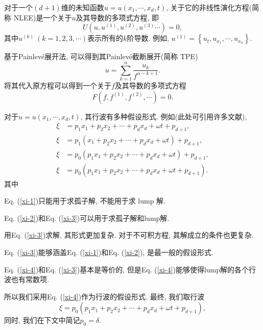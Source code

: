 \documentclass[12pt,a4paper,UTF8]{article}
\newcommand{\sbrace}[1]{\left(#1\right)}
\newcommand{\bbrace}[1]{\left\{#1\right\}}
\newcommand{\up}[1]{^{(#1)}}
\newcommand{\Painleve}{Painlev{\'e}}
\newcommand{\refeqn}[1]{Eq. (\ref{#1})}
\begin{document}
对于一个$(d+1)$维的未知函数$u=u(x_1,\cdots,x_d,t)$, 关于它的非线性演化方程(简称 NLEE)是一个关于$u$及其导数的多项式方程, 即
\begin{equation}
    U(u,u\up{1},u\up{2},u\up{3}\cdots)=0, \label{oeq}
\end{equation}
其中$u\up{k}~(k=1,2,3,\cdots)$表示所有的$k$阶导数. 例如, $u\up{1}=\bbrace{u_t,u_{x_1},\cdots,u_{x_n}}$.

基于\Painleve{}展开法, 可以得到其\Painleve{}截断展开(简称 TPE)
\begin{equation}
u=\sum_{k=1}^{\alpha}{\frac{u_k}{f^{\alpha-k+1}}}. 
\end{equation}
将其代入原方程可以得到一个关于$f$及其导数的多项式方程 
\begin{equation}
F\sbrace{f,f\up{1},f\up{2},\cdots}=0.
\end{equation}

对于$u=u\sbrace{x_1,\cdots,x_d,t}$, 其行波有多种假设形式. 例如(此处可引用许多文献), 
\begin{subequations}
\begin{align}
\xi&=p_1 x_1 + p_2 x_2 + \cdots + p_d x_d + \omega t+p_{d+1},  \label{xi-1}\\ 
\xi&=p_1 (x_1 + p_2 x_2 + \cdots + p_d x_d + \omega t)+p_{d+1}, \label{xi-2}\\ 
\xi&=p_0 \sbrace{p_1 x_1 + p_2 x_2 + \cdots + p_d x_d + \omega t}+p_{d+1}, \label{xi-3}\\
\xi&=p_0 \sbrace{p_1 x_1 + p_2 x_2 + \cdots + p_d x_d + \omega t+p_{d+1}}. \label{xi-4} 
\end{align}
\end{subequations}
其中
\begin{compactitem}[\textbullet]
\item \refeqn{xi-1}只能用于求孤子解, 不能用于求 lump 解.
\item \refeqn{xi-2}和\refeqn{xi-3}可以用于求孤子解和lump解. 
\item 用\refeqn{xi-3}求解, 其形式更加复杂. 对于不可积方程, 其解成立的条件也更复杂.
\item \refeqn{xi-3}能够涵盖\refeqn{xi-1}和\refeqn{xi-2}, 是最一般的假设形式.
\item \refeqn{xi-4}和\refeqn{xi-3}基本是等价的, 但是\refeqn{xi-4}能够使得lump解的各个行波也有常数项.
\end{compactitem}
所以我们采用\refeqn{xi-4}作为行波的假设形式. 最终, 我们取行波
\begin{equation}
  \xi=p_0 \sbrace{p_1 x_1 + p_2 x_2 + \cdots + p_d x_d + \omega t+p_{d+1}}, 
  \label{xi}
\end{equation}
同时, 我们在下文中简记$p_0=\delta$. 
\end{document}
